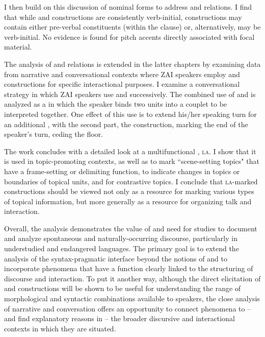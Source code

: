 I then build on this discussion of nominal forms to address  and  relations. I find that while  and  constructions are consistently verb-initial,  constructions may contain either pre-verbal constituents (within the clause) or, alternatively, may be verb-initial. No evidence is found for pitch accents directly associated with focal material. 

The analysis of  and  relations is extended in the latter chapters by examining data from narrative and conversational contexts where ZAI speakers employ  and  constructions for specific interactional purposes. I examine a conversational strategy in which ZAI speakers use  and  successively. The combined use of  and  is analyzed as a  in which the speaker binds two  units into a couplet to be interpreted together. One effect of this use is to extend his/her speaking turn for an additional , with the second part, the  construction, marking the end of the speaker's turn, ceding the floor. 

\largerpage[-1]
The work concludes with a detailed look at a multifunctional , \textsc{la}. I show that it is used in topic-promoting contexts, as well as to mark ``scene-setting topics" that have a frame-setting or delimiting function, to indicate changes in topics or boundaries of topical units, and for contrastive topics. I conclude that \textsc{la}-marked constructions should be viewed not only as a resource for marking various types of topical information, but more generally as a resource for organizing talk and interaction. 

Overall, the analysis demonstrates the value of and need for  studies to document and analyze spontaneous and naturally-occurring discourse, particularly in understudied and endangered languages.  The primary goal is to extend the analysis of the syntax-pragmatic interface beyond the notions of  and  to incorporate phenomena that have a function clearly linked to the structuring of discourse and interaction. To put it another way, although the direct elicitation of  and  constructions will be shown to be useful for understanding the range of morphological and syntactic combinations available to speakers, the close analysis of narrative and conversation offers an opportunity to connect  phenomena to -- and find explanatory reasons in -- the broader discursive and interactional contexts in which they are situated.


